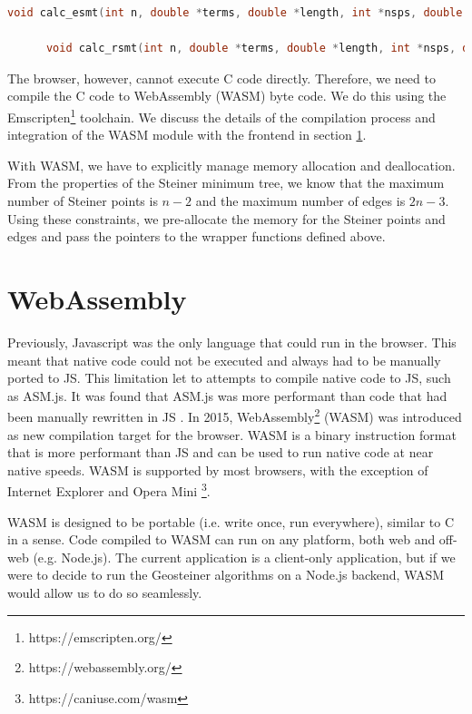 \documentclass{l4proj}
\begin{document}
\begin{lstlisting}[language=C,caption=Wrapper functions for the Geosteiner library,label=lst:wrapper_functions]
      void calc_esmt(int n, double *terms, double *length, int *nsps, double *sps, int *nedges, int *edges);

      void calc_rsmt(int n, double *terms, double *length, int *nsps, double *sps, int *nedges, int *edges);
\end{lstlisting}

The browser, however, cannot execute C code directly. Therefore, we need to compile the C code to WebAssembly (WASM) byte code. We do this using the Emscripten\footnote{https://emscripten.org/} toolchain.
We discuss the details of the compilation process and integration of the WASM module with the frontend in section \ref{sec:webassembly}.

With WASM, we have to explicitly manage memory allocation and deallocation. From the properties of the Steiner minimum tree, we know that the maximum number of Steiner points is $n - 2$ and the maximum number of edges is $2n - 3$. Using these constraints, we pre-allocate the memory for the Steiner points and edges and pass the pointers to the wrapper functions defined above.


\section{WebAssembly}
\label{sec:webassembly}
Previously, Javascript was the only language that could run in the browser. This meant that native code could not be executed and always had to be manually ported to JS.
This limitation let to attempts to compile native code to JS, such as ASM.js. It was found that ASM.js was more performant than code that had been manually rewritten in JS \citep{WebAssemblyIntro}.
In 2015, WebAssembly\footnote{https://webassembly.org/} (WASM) was introduced as new compilation target for the browser. WASM is a binary instruction format that is more performant than JS and can be used to run native code at near native speeds.
WASM is supported by most browsers, with the exception of Internet Explorer and Opera Mini \footnote{https://caniuse.com/wasm}.

WASM is designed to be portable (i.e. write once, run everywhere), similar to C in a sense. Code compiled to WASM can run on any platform, both web and off-web (e.g. Node.js).
The current application is a client-only application, but if we were to decide to run the Geosteiner algorithms on a Node.js backend, WASM would allow us to do so seamlessly.
\end{document}
